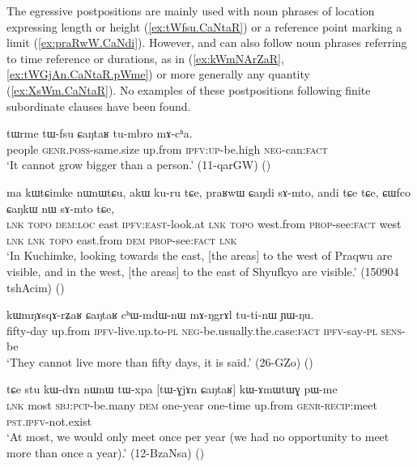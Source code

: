 The egressive postpositions are mainly used with noun phrases of location expressing length or height (\ref{ex:tWfsu.CaNtaR}) or a reference point marking a limit (\ref{ex:praRwW.CaNdi}). However,  and  can also follow noun phrases referring to time reference or durations, as in (\ref{ex:kWmNArZaR}, \ref{ex:tWGjAn.CaNtaR.pWme}) or more generally any quantity (\ref{ex:XsWm.CaNtaR}). No examples of these postpositions following finite subordinate clauses have been found.


\begin{exe}
\ex \label{ex:tWfsu.CaNtaR}
 \gll tɯrme tɯ-fsu ɕaŋtaʁ tu-mbro mɤ-cʰa. \\
people \textsc{genr}.\textsc{poss}-same.size up.from \textsc{ipfv}:\textsc{up}-be.high \textsc{neg}-can:\textsc{fact} \\
\glt `It cannot grow bigger than a person.' (11-qarGW)
()
\end{exe}
 
\begin{exe}
\ex \label{ex:praRwW.CaNdi}
 \gll ma kɯtɕimke nɯnɯtɕu, akɯ ku-ru tɕe, praʁwɯ ɕaŋdi sɤ-mto, 
andi tɕe tɕe, ɕɯfco ɕaŋkɯ nɯ sɤ-mto tɕe, \\
\textsc{lnk}  \textsc{topo} \textsc{dem}:\textsc{loc} east \textsc{ipfv}:\textsc{east}-look.at \textsc{lnk}  \textsc{topo} west.from \textsc{prop}-see:\textsc{fact} west \textsc{lnk} \textsc{lnk}  \textsc{topo} east.from \textsc{dem} \textsc{prop}-see:\textsc{fact} \textsc{lnk} \\
\glt `In Kuchimke, looking towards the east, [the areas] to the west of Praqwu are visible, and in the west, [the areas] to the east of Shyufkyo are visible.' (150904 tshAcim)
()
\end{exe}

\begin{exe}
\ex \label{ex:kWmNArZaR}
 \gll kɯmŋɤsqɤ-rʑaʁ ɕaŋtaʁ cʰɯ-mdɯ-nɯ mɤ-ŋgrɤl tu-ti-nɯ ɲɯ-ŋu.  \\
 fifty-day up.from \textsc{ipfv}-live.up.to-\textsc{pl} \textsc{neg}-be.usually.the.case:\textsc{fact} \textsc{ipfv}-say-\textsc{pl} \textsc{sens}-be \\
\glt `They cannot live more than fifty days, it is said.' (26-GZo) ()
\end{exe}

\begin{exe}
\ex \label{ex:tWGjAn.CaNtaR.pWme}
 \gll tɕe stu kɯ-dɤn nɯnɯ tɯ-xpa [tɯ-ɣjɤn ɕaŋtaʁ] kɯ-ɤmɯtɯɣ pɯ-me \\
 \textsc{lnk} most \textsc{sbj}:\textsc{pcp}-be.many \textsc{dem} one-year one-time up.from \textsc{genr}-\textsc{recip}:meet \textsc{pst}.\textsc{ipfv}-not.exist \\
 \glt `At most, we would only meet once per year (we had no opportunity to meet more than once a year).' (12-BzaNsa)
()
 \end{exe}

